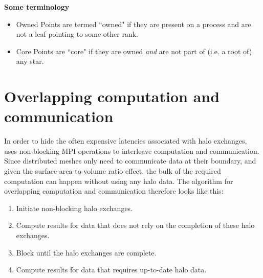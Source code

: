 \documentclass[thesis]{subfiles}
\begin{document}
\begin{figure}


% 


\end{figure}

\textbf{Some terminology}

\begin{itemize}
  \item Owned
    Points are termed ``owned" if they are present on a process and are not a leaf pointing to some other rank.
  \item Core
    Points are ``core" if they are owned \textit{and} are not part of (i.e. a root of) any star.
\end{itemize}


\section{Overlapping computation and communication}

In order to hide the often expensive latencies associated with halo exchanges,  uses non-blocking MPI operations to interleave computation and communication.
Since distributed meshes only need to communicate data at their boundary, and given the surface-area-to-volume ratio effect, the bulk of the required computation can happen without using any halo data.
The algorithm for overlapping computation and communication therefore looks like this:

\begin{enumerate}
  \item Initiate non-blocking halo exchanges.
  \item Compute results for data that does not rely on the completion of these halo exchanges.
  \item Block until the halo exchanges are complete.
  \item Compute results for data that requires up-to-date halo data.
\end{enumerate}
\end{document}
